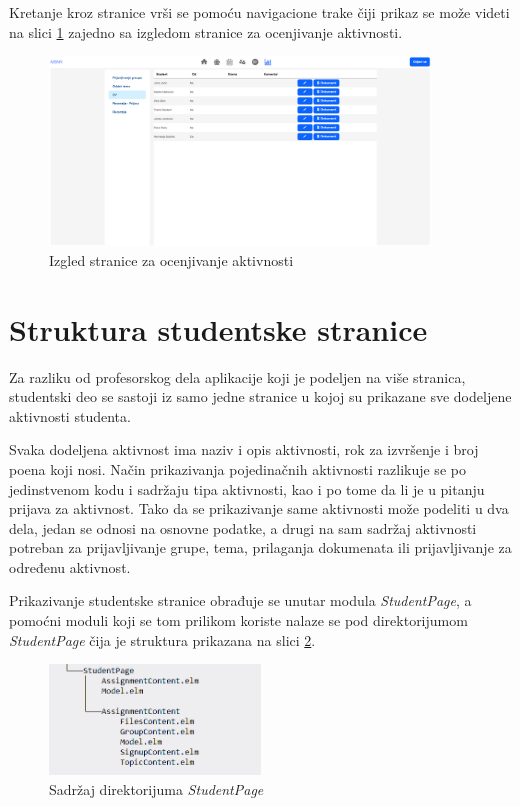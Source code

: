 \documentclass[12pt,oneside]{memoir}
\begin{document}
Kretanje kroz stranice vrši se pomoću navigacione trake čiji prikaz se može videti na
slici \ref{fig:professor-page} zajedno sa izgledom stranice za ocenjivanje aktivnosti.
\begin{figure}[!ht]
  \centering
  \includegraphics[width=0.9\textwidth]{professor-page.png}
  \caption{Izgled stranice za ocenjivanje aktivnosti}
  \label{fig:professor-page}
\end{figure}
\section{Struktura studentske stranice}
Za razliku od profesorskog dela aplikacije koji je podeljen na više stranica,
studentski deo se sastoji iz samo jedne stranice u kojoj su prikazane sve dodeljene
aktivnosti studenta. 

Svaka dodeljena aktivnost ima naziv i opis aktivnosti, rok za izvršenje
i broj poena koji nosi. Način prikazivanja pojedinačnih aktivnosti razlikuje se po
jedinstvenom kodu i sadržaju tipa aktivnosti, kao i po tome da li je u pitanju prijava
za aktivnost. Tako da se prikazivanje same aktivnosti može podeliti u dva dela,
jedan se odnosi na osnovne podatke, a drugi na sam sadržaj aktivnosti potreban za prijavljivanje grupe,
tema, prilaganja dokumenata ili prijavljivanje za određenu aktivnost.

Prikazivanje studentske stranice obrađuje se unutar modula \emph{StudentPage},
a pomoćni moduli koji se tom prilikom koriste nalaze se pod direktorijumom \emph{StudentPage} čija je
struktura prikazana na slici \ref{fig:student-dir}.
\begin{figure}[!ht]
  \centering
  \includegraphics[width=0.5\textwidth]{student-dir.png}
  \caption{Sadržaj direktorijuma \emph{StudentPage}}
  \label{fig:student-dir}
\end{figure}
\end{document}

